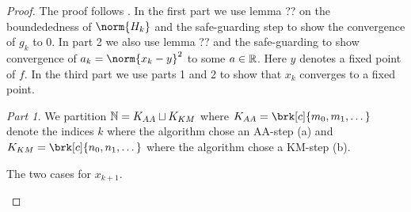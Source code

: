 \begin{figure}
\vspace*{1cm}
\scalebox{0.9}{

}
\end{figure}

\begin{proof}

The proof follows \cite[Theorem 6]{ZhaAA}. In the first part we use lemma ?? on the boundededness of $\norm{H_k}$ and the safe-guarding step to show the convergence of $g_k$ to $0$. In part 2 we also use lemma ?? and the safe-guarding to show convergence of $a_k=\norm{x_k-y}^2$ to some $a\in\mathbb{R}$. Here $y$ denotes a fixed point of $f$. In the third part we use parts 1 and 2 to show that $x_k$ converges to a fixed point.

\textit{Part 1.}
We partition $\mathbb{N}=K_{AA}\sqcup K_{KM}$ where $K_{AA}=\brk[c]{m_0,m_1,\dots}$ denote the indices $k$ where the algorithm chose an AA-step (a) and $K_{KM}=\brk[c]{n_0,n_1,\dots}$ where the algorithm chose a KM-step (b).

\begin{center}
\begin{algorithm}[H]
\caption{The two cases for $x_{k+1}$.}
\end{algorithm}
\end{center}


\end{proof}
